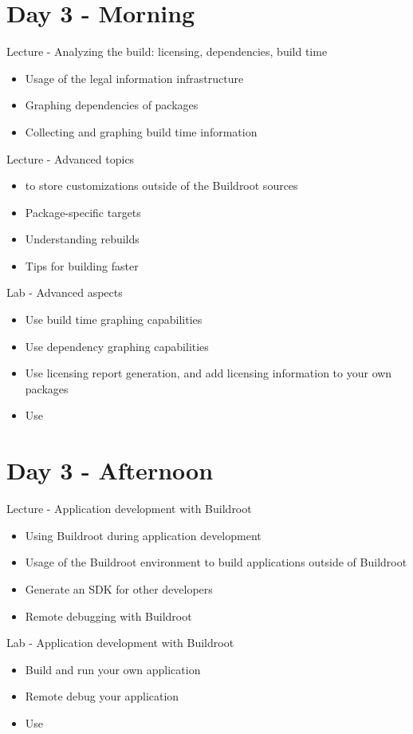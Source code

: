 \documentclass[a4paper,12pt,obeyspaces,spaces,hyphens]{article}
\begin{document}
\section{Day 3 - Morning}

\feagendatwocolumn
{Lecture - Analyzing the build: licensing, dependencies, build time}
{
  \begin{itemize}
  \item Usage of the legal information infrastructure
  \item Graphing dependencies of packages
  \item Collecting and graphing build time information
  \end{itemize}
}
{Lecture - Advanced topics}
{
  \begin{itemize}
  \item {} to store customizations outside of the
    Buildroot sources
  \item Package-specific targets
  \item Understanding rebuilds
  \item Tips for building faster
  \end{itemize}
}

\feagendaonecolumn
{Lab - Advanced aspects}
{
  \begin{itemize}
  \item Use build time graphing capabilities
  \item Use dependency graphing capabilities
  \item Use licensing report generation, and add licensing
    information to your own packages
  \item Use 
  \end{itemize}
}

\section{Day 3 - Afternoon}

\feagendatwocolumn
{Lecture - Application development with Buildroot}
{
  \begin{itemize}
  \item Using Buildroot during application development
  \item Usage of the Buildroot environment to build applications
    outside of Buildroot
  \item Generate an SDK for other developers
  \item Remote debugging with Buildroot
  \end{itemize}
}
{Lab - Application development with Buildroot}
{
  \begin{itemize}
  \item Build and run your own application
  \item Remote debug your application
  \item Use 
  \end{itemize}
}
\end{document}
